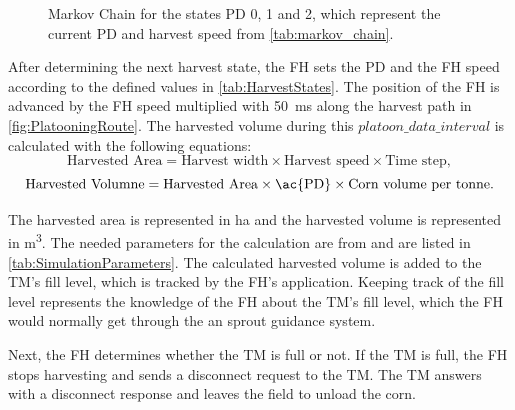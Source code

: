 \begin{figure}[H]
\centering
{}
\caption{Markov Chain for the states \acf{PD} 0, 1 and 2, which represent the current \ac{PD} and
harvest speed from \autoref{tab:markov_chain}.}
\label{fig:MarkovChain}
\end{figure}

After determining the next harvest state, the \ac{FH} sets the \ac{PD} and the \ac{FH} speed according to the defined values in
\autoref{tab:HarvestStates}.
The position of the \ac{FH} is advanced by the \ac{FH} speed multiplied with \SI{50}{\milli\second} along the
harvest path in \autoref{fig:PlatooningRoute}.
The harvested volume during this $platoon\_data\_interval$ is calculated with the following
equations:
\begin{equation}
	\label{eq:AreaCalculation}
	\text{Harvested Area} =
		\text{Harvest width} \times \text{Harvest speed} \times \text{Time step}
	,
\end{equation}
\begin{equation}
	\label{eq:VolumneCalculation}
	\text{Harvested Volumne} =
	\text{Harvested Area} \times \text{\ac{PD}} \times \text{Corn volume per tonne}.
\end{equation}

The harvested area is represented in \si{\hectare} and
the harvested volume is represented in \si{\cubic\metre}.
The needed parameters for the calculation are from \cite{faustzahlen2018} and are listed in \autoref{tab:SimulationParameters}.
The calculated harvested volume is added to the \ac{TM}'s fill level, which is tracked by the \ac{FH}'s application.
Keeping track of the fill level represents the knowledge of the \ac{FH} about the \ac{TM}'s fill level, which the \ac{FH} would
normally get through the an sprout guidance system.

Next, the \ac{FH} determines whether the \ac{TM} is full or not.
If the \ac{TM} is full, the \ac{FH} stops harvesting and sends a disconnect request to the \ac{TM}.
The \ac{TM} answers with a disconnect response and leaves the field to unload the corn.

